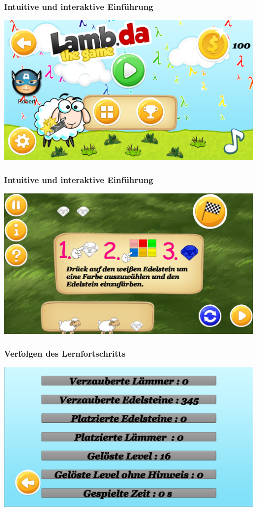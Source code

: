 \documentclass[18pt]{beamer}
\begin{document}
\begin{frame}
	\frametitle{Intuitive und interaktive Einführung}
	\includegraphics[width=\textwidth]{pictures/mainmenu}
\end{frame}

\begin{frame}
	\frametitle{Intuitive und interaktive Einführung}
	\includegraphics[width=\textwidth]{pictures/tutorial_message}
\end{frame}

\begin{frame}
	\frametitle{Verfolgen des Lernfortschritts}
	\includegraphics[width=\textwidth]{pictures/statisticmenu}
\end{frame}
\end{document}
